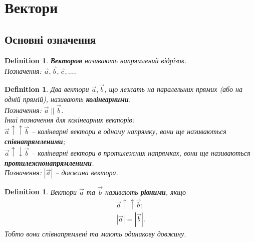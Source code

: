 \documentclass[a4paper, 10pt]{extarticle}
\theoremstyle{theoremdd}
\theoremstyle{theoremdd}
\newtheorem{definition}[theorem]{Definition}
\theoremstyle{theoremdd}
\theoremstyle{theoremdd}
\theoremstyle{theoremdd}
\theoremstyle{theoremdd}
\theoremstyle{theoremdd}
\theoremstyle{theoremdd}
\begin{document}
\tableofcontents
\newpage
	
\section{Вектори}
\subsection{Основні означення}
\begin{definition}
\textbf{Вектором} називають напрямлений відрізок.\\
Позначення: $\vec{a}, \vec{b}, \vec{c}, \dots$.
\begin{figure}[h]
\centering
{}
\end{figure}
\end{definition}

\begin{definition}
Два вектори $\vec{a},\vec{b}$, що лежать на паралельних прямих (\textit{або на одній прямій}), називають \textbf{колінеарними}.\\
\textit{Позначення}: $\vec{a} \parallel \vec{b}$.
\bigskip \\
Інші позначення для колінеарних векторів: \\ 
$\vec{a} \uparrow \uparrow \vec{b}$ -- колінеарні вектори в одному напрямку, вони ще називаються \textbf{співнапрямленими};\\
$\vec{a} \uparrow \downarrow \vec{b}$ -- колінеарні вектори в протилежних напрямках, вони ще називаються \textbf{протилежнонапрямленими}.
\bigskip \\
\textit{Позначення}: $|\vec{a}|$ -- довжина вектора.
\end{definition}

\begin{definition}
Вектори $\vec{a}$ та $\vec{b}$ називають \textbf{рівними}, якщо
	\begin{align*}
	\vec{a} \uparrow \uparrow \vec{b};\\
	|\vec{a}| = |\vec{b}|.
	\end{align*}
	Тобто вони співнапрямлені та мають одинакову довжину.
\end{definition}
\end{document}
